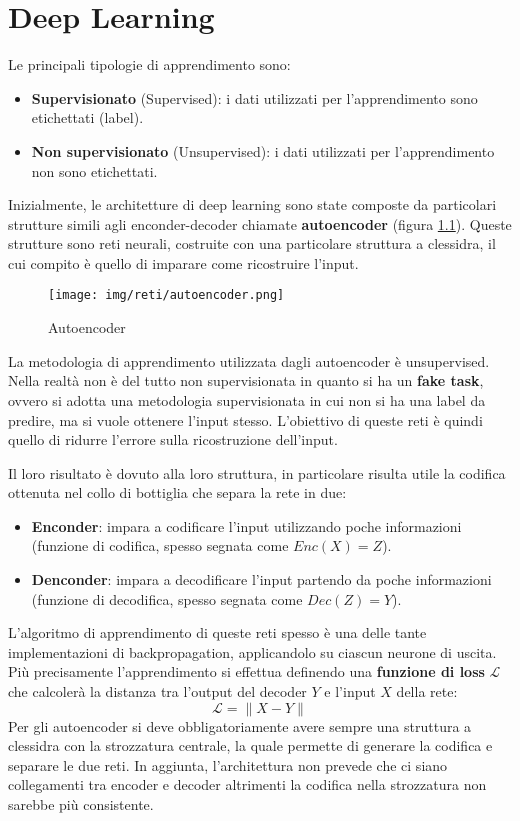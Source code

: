 \chapter{Deep Learning}
Le principali tipologie di apprendimento sono:
\begin{itemize}
      \item \textbf{Supervisionato} (Supervised): i dati utilizzati per
            l'apprendimento sono etichettati (label).
      \item \textbf{Non supervisionato} (Unsupervised): i dati utilizzati per
            l'apprendimento non sono etichettati.
\end{itemize}
Inizialmente, le architetture di deep learning sono state composte da
particolari strutture simili agli enconder-decoder chiamate \textbf{autoencoder}
(figura \ref{fig:autoencoder}). Queste strutture sono reti neurali, costruite
con una particolare struttura a clessidra, il cui compito è quello di imparare
come ricostruire l'input.
\begin{figure}[!ht]
      \centering
      \texttt{[image: img/reti/autoencoder.png]}
      \caption{Autoencoder}
      \label{fig:autoencoder}
\end{figure}
La metodologia di apprendimento utilizzata dagli autoencoder è unsupervised.
Nella realtà non è del tutto non supervisionata in quanto si ha un \textbf{fake
      task}, ovvero si adotta una metodologia supervisionata in cui non si ha
una label da predire, ma si vuole ottenere l'input stesso. L'obiettivo di
queste reti è quindi quello di ridurre l'errore sulla ricostruzione dell'input.

Il loro risultato è dovuto alla loro struttura, in particolare risulta utile la
codifica ottenuta nel collo di bottiglia che separa la rete in due:
\begin{itemize}
      \item \textbf{Enconder}: impara a codificare l'input utilizzando poche
            informazioni (funzione di codifica, spesso segnata come $Enc(X) = Z$).
      \item \textbf{Denconder}: impara a decodificare l'input partendo da poche
            informazioni (funzione di decodifica, spesso segnata come $Dec(Z) = Y$).
\end{itemize}
L'algoritmo di apprendimento di queste reti spesso è una delle tante
implementazioni di backpropagation, applicandolo su ciascun neurone di uscita.
Più precisamente l'apprendimento si effettua definendo una \textbf{funzione di
      loss} $\mathcal{L}$ che calcolerà la distanza tra l'output del decoder $Y$
e l'input $X$ della rete:
\begin{equation}
      \mathcal{L} = \| X - Y \|
\end{equation}
Per gli autoencoder si deve obbligatoriamente avere sempre una struttura a
clessidra con la strozzatura centrale, la quale permette di generare la codifica
e separare le due reti. In aggiunta, l'architettura non prevede che ci siano
collegamenti tra encoder e decoder altrimenti la codifica nella strozzatura non
sarebbe più consistente.


